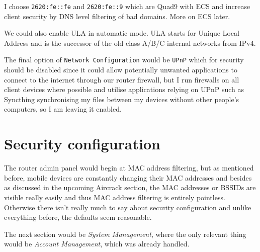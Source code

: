 \documentclass[../wifi-security.tex]{subfiles}
\begin{document}

I choose \texttt{2620:fe::fe} and \texttt{2620:fe::9} which are Quad9 with ECS and increase client security by DNS level filtering of bad domains. More on ECS later. %

We could also enable ULA in automatic mode. ULA starts for Unique Local Address and is the successor of the old class A/B/C internal networks from IPv4.

The final option of \texttt{Network Configuration} would be \texttt{UPnP} which for security should be disabled since it could allow potentially unwanted applications to connect to the internet through our router firewall, but I run firewalls on all client devices where possible and utilise applications relying on UPnP such as Syncthing synchronising my files between my devices without other people's computers, so I am leaving it enabled.

\section{Security configuration}

The router admin panel would begin at MAC address filtering, but as mentioned before, mobile devices are constantly changing their MAC addresses and besides as discussed in the upcoming Aircrack section, the MAC addresses or BSSIDs are visible really easily and thus MAC address filtering is entirely pointless. Otherwise there isn't really much to say about security configuration and unlike everything before, the defaults seem reasonable.

The next section would be \textit{System Management}, where the only relevant thing would be \textit{Account Management}, which was already handled.

\printbibliography[title={Chapter references}]
\end{document}
